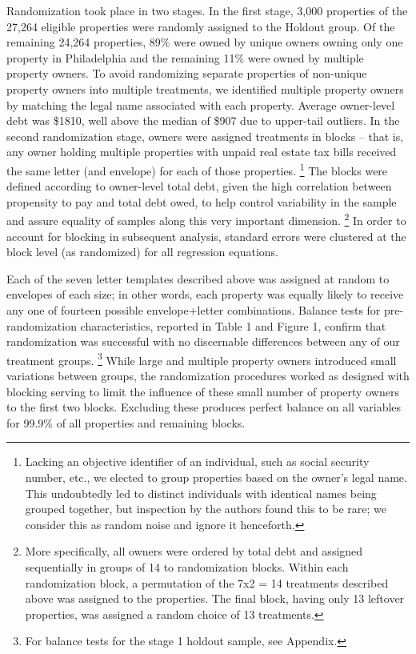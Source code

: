 \documentclass[12pt,titlepage]{article}
\begin{document}
Randomization took place in two stages. In the first stage, 3,000 
properties of the 27,264 eligible properties were randomly assigned 
to the Holdout group. Of the remaining 24,264 properties, 89\% were 
owned by unique owners owning only one property in Philadelphia and 
the remaining 11\% were owned by multiple property owners. To avoid 
randomizing separate properties of non-unique property owners into 
multiple treatments, we identified multiple property owners by 
matching the legal name associated with each property. Average 
owner-level debt was \$1810, well above the median of \$907 due to 
upper-tail outliers. In the second randomization stage, owners were 
assigned treatments in blocks – that is, any owner holding multiple 
properties with unpaid real estate tax bills received the same letter 
(and envelope) for each of those properties.
\footnote{
	Lacking an objective identifier of an individual, such as social 
	security number, etc., we elected to group properties based on 
	the owner's legal name. This undoubtedly led to distinct 
	individuals with identical names being grouped together, but 
	inspection by the authors found this to be rare; we consider this 
	as random noise and ignore it henceforth.
}
The blocks were defined according to owner-level total debt, given 
the high correlation between propensity to pay and total debt owed, 
to help control variability in the sample and assure equality of 
samples along this very important dimension.
\footnote{
	More specifically, all owners were ordered by total debt and assigned 
	sequentially in groups of 14 to randomization blocks. Within each 
	randomization block, a permutation of the 7x2 = 14 treatments described 
	above was assigned to the properties. The final block, having only 13 
	leftover properties, was assigned a random choice of 13 treatments.
}
In order to account for blocking in subsequent analysis, standard errors 
were clustered at the block level (as randomized) for all regression equations. 

Each of the seven letter templates described above was assigned at random 
to envelopes of each size; in other words, each property was equally 
likely to receive any one of fourteen possible envelope+letter combinations. 
Balance tests for pre-randomization characteristics, 
reported in Table 1 and Figure 1, confirm that randomization was successful 
with no discernable differences between any of our treatment groups.
\footnote{For balance tests for the stage 1 holdout sample, see Appendix.}
While large and multiple property owners introduced small variations 
between groups, the randomization procedures worked as designed with 
blocking serving to limit the influence of these small number of property 
owners to the first two blocks. Excluding these produces perfect balance 
on all variables for 99.9\% of all properties and remaining blocks.
\end{document}
